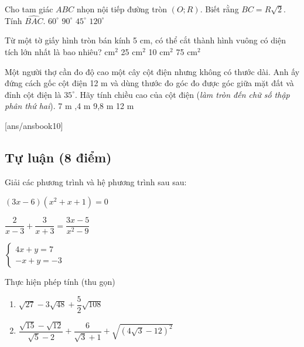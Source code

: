 \begin{ex}
	Cho tam giác $ABC$ nhọn nội tiếp đường tròn $(O;R)$. Biết rằng $BC=R\sqrt{2}$. Tính $\widehat{BAC}$.
\choice
{$60^\circ$}
{$90^\circ$}
{\True $45^\circ$}
{$120^\circ$}
\end{ex}

\begin{ex}
Từ một tờ giấy hình tròn bán kính 5 cm, có thể cắt thành hình vuông có diện tích lớn nhất là bao nhiêu?
\choice
{ $\text{cm}^2$}
{25 $\text{cm}^2$}
{10 $\text{cm}^2$}
{75 $\text{cm}^2$}
\end{ex}

\begin{ex}
 Một người thợ cần đo độ cao một cây cột điện nhưng không có thước dài. Anh ấy đứng cách gốc cột điện 12 m và dùng thước đo góc đo được góc giữa mặt đất và đỉnh cột điện là $35^\circ$. Hãy tính chiều cao của cột điện (\textit{làm tròn đến chữ số thập phân thứ hai}).
 \choice
 {7 m}
 {,4 m}
 {9,8 m}
 {12 m}
\end{ex}
    
[ans/ansbook10]
\setcounter{bt}{0}
\subsection{Tự luận (8 điểm)}

\begin{bt}[1,5 điểm]
Giải các phương trình và hệ phương trình sau sau:
\begin{listEX}[3]
    \item $(3x-6)(x^2+x+1)=0$
    \item $\dfrac{2}{x-3}+\dfrac{3}{x+3}=\dfrac{3 x-5}{x^2-9}$
    \item  $\begin{cases}4 x+y=7 \\ -x+y=-3\end{cases}$
\end{listEX}
\end{bt}

\begin{bt}[1,5 điểm]
Thực hiện phép tính (thu gọn)
\begin{enumerate}
    \item $\sqrt{27}-3 \sqrt{48}+\dfrac{5}{2} \sqrt{108}$
    \item $\dfrac{\sqrt{15}-\sqrt{12}}{\sqrt{5}-2}+\dfrac{6}{\sqrt{3}+1}+\sqrt{(4 \sqrt{3}-12)^2}$
\end{enumerate}
\end{bt}

